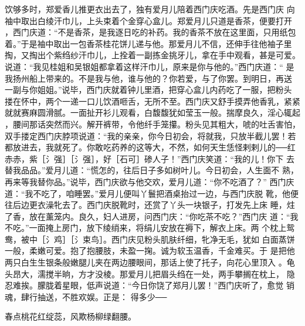 饮够多时，郑爱香儿推更衣出去了，独有爱月儿陪着西门庆吃酒。先是西门庆
向袖中取出白绫汗巾儿，上头束着个金穿心盒儿。郑爱月儿只道是香茶，便要打开
，西门庆道：“不是香茶，是我逐日吃的补药。我的香茶不放在这里面，只用纸包
着。”于是袖中取出一包香茶桂花饼儿递与他。那爱月儿不信，还伸手往他袖子里
掏，又掏出个紫绉纱汗巾儿，上拴着一副拣金挑牙儿，拿在手中观看，甚是可爱。
说道：“我见桂姐和吴银姐都拿着这样汗巾儿，原来是你与他的。”西门庆道：“
是我扬州船上带来的。不是我与他，谁与他的？你若爱，与了你罢。到明日，再送
一副与你姐姐。”说毕，西门庆就着钟儿里酒，把穿心盒儿内药吃了一服，把粉头
搂在怀中，两个一递一口儿饮酒咂舌，无所不至。西门庆又舒手摸弄他香乳，紧紧
就就赛麻圆滑腻。一面扯开衫儿观看，白馥馥犹如莹玉一般。揣摩良久，淫心辄起
，腰间那话突然而兴。解开裤带，令他纤手笼攥。粉头见其粗大，唬的吐舌害怕，
双手搂定西门庆脖项说道：“我的亲亲，你今日初会，将就我，只放半截儿罢！若
都放进去，我就死了。你敢吃药养的这等大，不然，如何天生恁怪剌剌儿的──红
赤赤，紫［氵强］［氵强］，好［石可］碜人子！”西门庆笑道：“我的儿！你下
去替我品品。”爱月儿道：“慌怎的，往后日子多如树叶儿。今日初会，人生面不
熟，再来等我替你品。”说毕，西门庆欲与他交欢，爱月儿道：“你不吃酒了？”
西门庆道：“我不吃了，咱睡罢。”爱月儿便叫丫鬟把酒桌抬过一边，与西门庆脱
靴，他便往后边更衣澡牝去了。西门庆脱靴时，还赏了丫头一块银子，打发先上床
睡，炷了香，放在薰笼内。良久，妇人进房，问西门庆：“你吃茶不吃？”西门庆
道：“我不吃。”一面掩上房门，放下绫绡来，将绢儿安放在褥下，解衣上床。两
个枕上鸳鸯，被中［氵鸡］［氵束鸟］。西门庆见粉头肌肤纤细，牝净无毛，犹如
白面蒸饼一般，柔嫩可爱。抱了抱腰肢，未盈一掬。诚为软玉温香，千金难买。于
是把他两只白生生银条般嫩腿儿夹在两边腰眼间，那话上使了托子，向花心里顶入
。龟头昂大，濡搅半晌，方才没棱。那爱月儿把眉头绉在一处，两手攀搁在枕上，
隐忍难挨。朦胧着星眼，低声说道：“今日你饶了郑月儿罢！”西门庆听了，愈觉
销魂，肆行抽送，不胜欢娱。正是： 得多少──

春点桃花红绽蕊，风欺杨柳绿翻腰。

